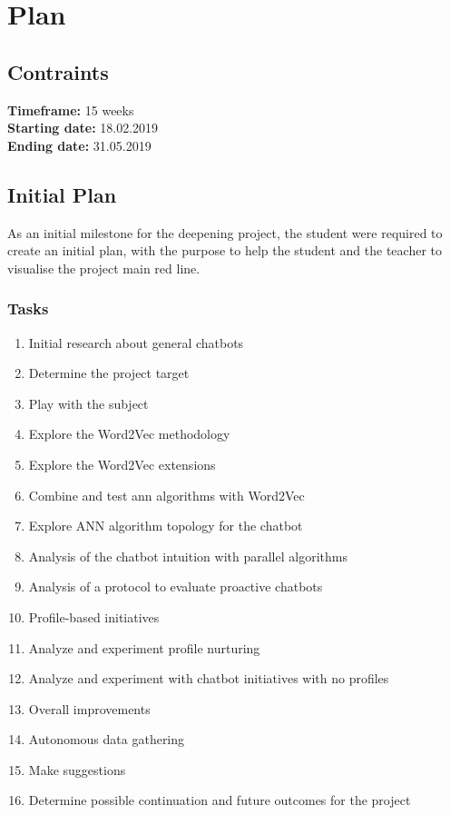 \chapter{Plan}


\section{Contraints}
\textbf{Timeframe:} 15 weeks\\
\textbf{Starting date:} 18.02.2019\\
\textbf{Ending date:} 31.05.2019

\section{Initial Plan}
As an initial milestone for the deepening project, the student were required to create an initial plan, with the purpose to help the student and the teacher to visualise the project main red line.
\subsection{Tasks}
\begin{enumerate}
	\setlength\itemsep{0em}
	\item Initial research about general chatbots
	\item Determine the project target
	\item Play with the subject
	\item Explore the Word2Vec methodology
	\item Explore the Word2Vec extensions
	\item Combine and test \acrshort{ann} algorithms with Word2Vec
	\item Explore ANN algorithm topology for the chatbot
	\item Analysis of the chatbot intuition with parallel algorithms
	\item Analysis of a protocol to evaluate proactive chatbots
	\item Profile-based initiatives
	\item Analyze and experiment profile nurturing 
	\item Analyze and experiment with chatbot initiatives with no profiles
	\item Overall improvements
	\item Autonomous data gathering
	\item Make suggestions
	\item Determine possible continuation and future outcomes for the project
\end{enumerate}

